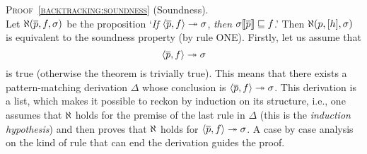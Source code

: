 
\noindent\textsc{Proof~\ref{backtracking:soundness}} (Soundness).\\
\noindent Let \(\ind{R}(\overline{p}, f, \sigma)\) be the proposition
`\emph{If} \(\smj{f}{\overline{p}}{\sigma}\),
\emph{then} \(\subst{\overline{p}}{\sigma} \sqsubseteq f\).'
Then \(\ind{R}(p, [h], \sigma)\) is equivalent to the soundness
property (by rule \textsf{ONE}). Firstly, let us assume that
\begin{equation}
  \smj{f}{\overline{p}}{\sigma} \label{x:sound:head}
\end{equation}
is true (otherwise the theorem is trivially true). This means that
there exists a pattern\hyp{}matching derivation \(\Delta\) whose
conclusion is \(\smj{f}{\overline{p}}{\sigma}\). This derivation is a
list, which makes it possible to reckon by induction on its structure,
i.e., one assumes that \(\ind{R}\) holds for the premise of the last
rule in \(\Delta\) (this is the \emph{induction hypothesis}) and then
proves that \(\ind{R}\) holds for \(\smj{f}{\overline{p}}{\sigma}\). A
case by case analysis on the kind of rule that can end the derivation
guides the proof.
